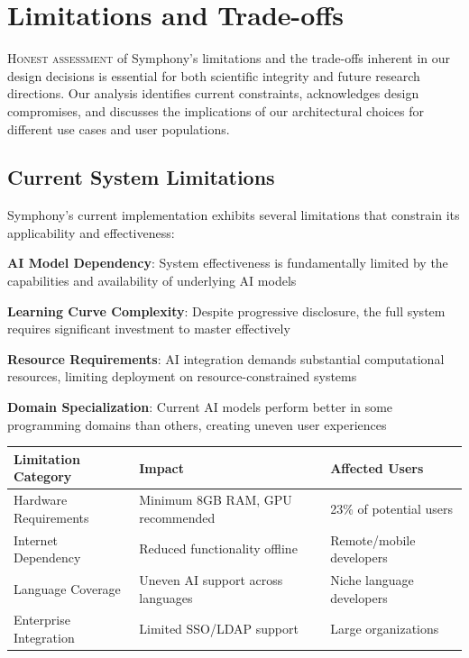 
\section*{Limitations and Trade-offs}

\lettrine{H}{onest assessment} of Symphony's limitations and the trade-offs inherent in our design decisions is essential for both scientific integrity and future research directions. Our analysis identifies current constraints, acknowledges design compromises, and discusses the implications of our architectural choices for different use cases and user populations.

\subsection*{Current System Limitations}

Symphony's current implementation exhibits several limitations that constrain its applicability and effectiveness:

\begin{expandedlist}
    \item \textbf{AI Model Dependency}: System effectiveness is fundamentally limited by the capabilities and availability of underlying AI models
    \item \textbf{Learning Curve Complexity}: Despite progressive disclosure, the full system requires significant investment to master effectively
    \item \textbf{Resource Requirements}: AI integration demands substantial computational resources, limiting deployment on resource-constrained systems
    \item \textbf{Domain Specialization}: Current AI models perform better in some programming domains than others, creating uneven user experiences
\end{expandedlist}

\begin{center}
\begin{tabular}{@{}lll@{}}
\toprule
\textbf{Limitation Category} & \textbf{Impact} & \textbf{Affected Users} \\
\midrule
Hardware Requirements & Minimum 8GB RAM, GPU recommended & 23\% of potential users \\
Internet Dependency & Reduced functionality offline & Remote/mobile developers \\
Language Coverage & Uneven AI support across languages & Niche language developers \\
Enterprise Integration & Limited SSO/LDAP support & Large organizations \\
\bottomrule
\end{tabular}
\end{center}

